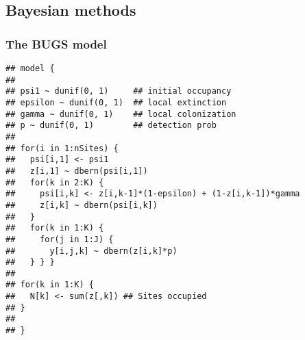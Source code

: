 \documentclass[color=usenames,dvipsnames]{beamer}\usepackage[]{graphicx}\usepackage[]{color}
\makeatletter
\newenvironment{kframe}{%
 \def\at@end@of@kframe{}%
 \ifinner\ifhmode%
  \def\at@end@of@kframe{\end{minipage}}%
  \begin{minipage}{\columnwidth}%
 \fi\fi%
 \def\FrameCommand##1{\hskip\@totalleftmargin \hskip-\fboxsep
 \colorbox{shadecolor}{##1}\hskip-\fboxsep
     \hskip-\linewidth \hskip-\@totalleftmargin \hskip\columnwidth}%
 \MakeFramed {\advance\hsize-\width
   \@totalleftmargin\z@ \linewidth\hsize
   \@setminipage}}%
 {\par\unskip\endMakeFramed%
 \at@end@of@kframe}
\newenvironment{knitrout}{}{} %
\makeatother
\begin{document}
\subsection{Bayesian methods}



\begin{frame}[fragile]
  \frametitle{The BUGS model}
\begin{knitrout}\scriptsize
{}\color{fgcolor}\begin{kframe}
\begin{verbatim}
## model {
## 
## psi1 ~ dunif(0, 1)     ## initial occupancy
## epsilon ~ dunif(0, 1)  ## local extinction
## gamma ~ dunif(0, 1)    ## local colonization
## p ~ dunif(0, 1)        ## detection prob
## 
## for(i in 1:nSites) {
##   psi[i,1] <- psi1
##   z[i,1] ~ dbern(psi[i,1])
##   for(k in 2:K) {
##     psi[i,k] <- z[i,k-1]*(1-epsilon) + (1-z[i,k-1])*gamma
##     z[i,k] ~ dbern(psi[i,k])
##   }
##   for(k in 1:K) {
##     for(j in 1:J) {
##       y[i,j,k] ~ dbern(z[i,k]*p)
##   } } }
## 
## for(k in 1:K) {
##   N[k] <- sum(z[,k]) ## Sites occupied
## }
## 
## }
\end{verbatim}
\end{kframe}
\end{knitrout}
\end{frame}
\end{document}
